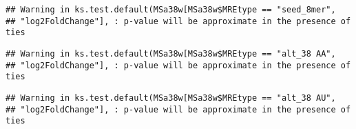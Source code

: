\documentclass[
]{article}
\newenvironment{Shaded}{\begin{snugshade}}{\end{snugshade}}
\newcommand{\FunctionTok}[1]{\textcolor[rgb]{0.13,0.29,0.53}{\textbf{#1}}}
\newcommand{\NormalTok}[1]{#1}
\newcommand{\OtherTok}[1]{\textcolor[rgb]{0.56,0.35,0.01}{#1}}
\newcommand{\SpecialCharTok}[1]{\textcolor[rgb]{0.81,0.36,0.00}{\textbf{#1}}}
\newcommand{\StringTok}[1]{\textcolor[rgb]{0.31,0.60,0.02}{#1}}
\begin{document}
\begin{verbatim}
## Warning in ks.test.default(MSa38w[MSa38w$MREtype == "seed_8mer",
## "log2FoldChange"], : p-value will be approximate in the presence of ties
\end{verbatim}

\begin{Shaded}
\end{Shaded}

\begin{verbatim}
## Warning in ks.test.default(MSa38w[MSa38w$MREtype == "alt_38 AA",
## "log2FoldChange"], : p-value will be approximate in the presence of ties
\end{verbatim}

\begin{Shaded}
\end{Shaded}

\begin{verbatim}
## Warning in ks.test.default(MSa38w[MSa38w$MREtype == "alt_38 AU",
## "log2FoldChange"], : p-value will be approximate in the presence of ties
\end{verbatim}
\end{document}
